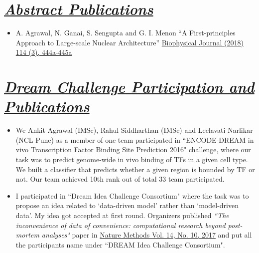 \documentclass{res}
\begin{document}
\begin{resume}
\begin{itemize}
\end{itemize}

\section{\sl \underline{Abstract Publications}}
\begin{itemize}
\item A. Agrawal, N. Ganai, S. Sengupta and G. I. Menon ``A First-principles Approach to Large-scale Nuclear Architecture'' 
\href{https://doi.org/10.1016/j.bpj.2017.11.2459}
{Biophysical Journal (2018) 114 (3), 444a-445a}
\end{itemize}


\section{\sl \underline{Dream Challenge Participation and Publications}}
\begin{itemize}
\item We Ankit Agrawal (IMSc), Rahul Siddharthan (IMSc) and Leelavati Narlikar (NCL Pune) as a member of one team participated in ``ENCODE-DREAM in vivo Transcription Factor Binding Site Prediction 2016" challenge, where our task was to predict genome-wide in vivo binding of TFs in a given cell type. We built a classifier that predicts whether a given region is bounded by TF or not. Our team achieved 10th rank out of total 33 team participated. 
\item I participated in ``Dream Idea Challenge Consortium" where the task was to propose an idea related to `data-driven model' rather 
than `model-driven data'. My idea got accepted at first round. Organizers published \emph{``The inconvenience of data of convenience: computational research beyond post-mortem analyses"} paper in \href{https://www.nature.com/articles/nmeth.4457}{Nature Methods Vol. 14, No. 10, 2017} and put all the participants name under ``DREAM Idea Challenge Consortium". 
\end{itemize}





\end{resume}
\end{document}
